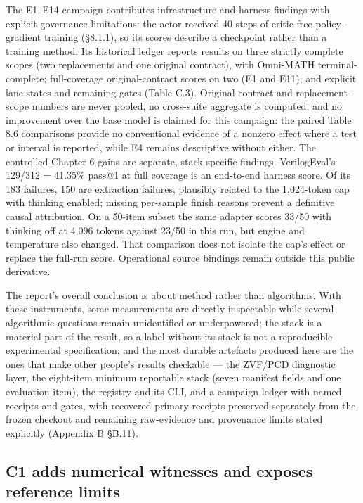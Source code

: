 \documentclass[12pt,a4paper]{report}
\begin{document}
The E1--E14 campaign contributes infrastructure and harness findings
with explicit governance limitations: the actor received 40 steps of
critic-free policy-gradient training (§8.1.1), so its scores describe a
checkpoint rather than a training method. Its historical ledger reports
results on three strictly complete scopes (two replacements and one
original contract), with Omni-MATH terminal-complete; full-coverage
original-contract scores on two (E1 and E11); and explicit lane states
and remaining gates (Table C.3). Original-contract and replacement-scope
numbers are never pooled, no cross-suite aggregate is computed, and no
improvement over the base model is claimed for this campaign: the paired
Table 8.6 comparisons provide no conventional evidence of a nonzero
effect where a test or interval is reported, while E4 remains
descriptive without either. The controlled Chapter 6 gains are separate,
stack-specific findings. VerilogEval's 129/312 = 41.35\% pass@1 at full
coverage is an end-to-end harness score. Of its 183 failures, 150 are
extraction failures, plausibly related to the 1,024-token cap with
thinking enabled; missing per-sample finish reasons prevent a definitive
causal attribution. On a 50-item subset the same adapter scores 33/50
with thinking off at 4,096 tokens against 23/50 in this run, but engine
and temperature also changed. That comparison does not isolate the cap's
effect or replace the full-run score. Operational source bindings remain
outside this public derivative.

The report's overall conclusion is about method rather than algorithms.
With these instruments, some measurements are directly inspectable while
several algorithmic questions remain unidentified or underpowered; the
stack is a material part of the result, so a label without its stack is
not a reproducible experimental specification; and the most durable
artefacts produced here are the ones that make other people's results
checkable --- the ZVF/PCD diagnostic layer, the eight-item minimum
reportable stack (seven manifest fields and one evaluation item), the
registry and its CLI, and a campaign ledger with named receipts and
gates, with recovered primary receipts preserved separately from the
frozen checkout and remaining raw-evidence and provenance limits stated
explicitly (Appendix B §B.11).

\subsection{C1 adds numerical witnesses and exposes reference
limits}\label{c1-adds-numerical-witnesses-and-exposes-reference-limits}
\end{document}
